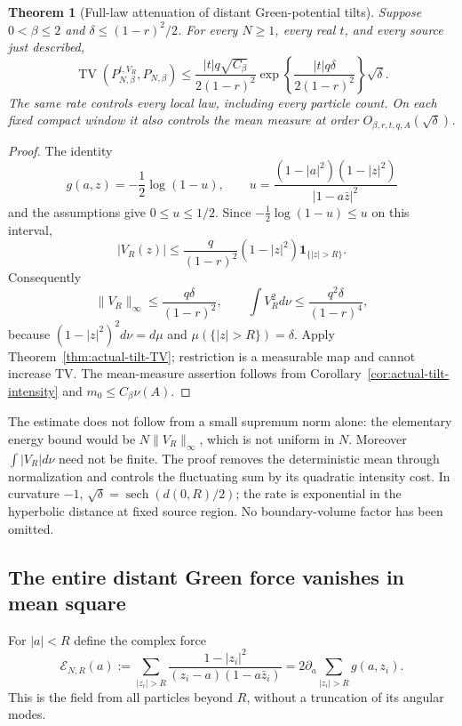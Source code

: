 \documentclass[11pt]{article}
\DeclareMathOperator{\TV}{TV}
\newtheorem{theorem}{Theorem}[section]
\theoremstyle{remark}\newtheorem{remark}[theorem]{Remark}
\begin{document}
\begin{theorem}[Full-law attenuation of distant Green-potential tilts]
\label{thm:green-tail-TV}
Suppose $0<\beta\le2$ and $\delta\le(1-r)^2/2$. For every $N\ge1$,
every real $t$, and every source just described,
\begin{equation}\label{eq:green-tail-TV}
 \TV(P_{N,\beta}^{t,V_R},P_{N,\beta})
 \le \frac{|t|q\sqrt{C_\beta}}{2(1-r)^2}
 \exp\!\left\{\frac{|t|q\delta}{2(1-r)^2}\right\}\sqrt\delta.
\end{equation}
The same rate controls every local law, including every particle
count. On each fixed compact window it also controls the mean
measure at order $O_{\beta,r,t,q,A}(\sqrt\delta)$.
\end{theorem}
\begin{proof}
The identity
\[
 g(a,z)=-\frac12\log(1-u),\qquad
 u=\frac{(1-|a|^2)(1-|z|^2)}{|1-a\bar z|^2}
\]
and the assumptions give $0\le u\le1/2$. Since
$-\frac12\log(1-u)\le u$ on this interval,
\[
 |V_R(z)|\le\frac{q}{(1-r)^2}(1-|z|^2)\mathbf1_{\{|z|>R\}}.
\]
Consequently
\[
 \|V_R\|_\infty\le\frac{q\delta}{(1-r)^2},\qquad
 \int V_R^2d\nu\le\frac{q^2\delta}{(1-r)^4},
\]
because $(1-|z|^2)^2d\nu=d\mu$ and
$\mu(\{|z|>R\})=\delta$. Apply
Theorem~\ref{thm:actual-tilt-TV}; restriction is a measurable map and
cannot increase TV. The mean-measure assertion follows from
Corollary~\ref{cor:actual-tilt-intensity} and
$m_0\le C_\beta\nu(A)$.
\end{proof}

The estimate does not follow from a small supremum norm alone:
the elementary energy bound would be $N\|V_R\|_\infty$, which is
not uniform in $N$. Moreover $\int |V_R|d\nu$ need not be finite.
The proof removes the deterministic mean through normalization and
controls the fluctuating sum by its quadratic intensity cost.
In curvature $-1$, $\sqrt\delta=\operatorname{sech}
(d(0,R)/2)$; the rate is exponential in the hyperbolic distance
at fixed source region. No boundary-volume factor has been omitted.

\subsection{The entire distant Green force vanishes in mean square}

For $|a|<R$ define the complex force
\[
 \mathcal E_{N,R}(a)
 :=\sum_{|z_i|>R}\frac{1-|z_i|^2}{(z_i-a)(1-a\bar z_i)}
 =2\partial_a\sum_{|z_i|>R}g(a,z_i).
\]
This is the field from all particles beyond $R$, without a truncation
of its angular modes.
\end{document}
